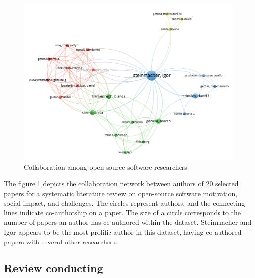 \begin{figure}[ht]
    \hspace*{-0.5in}
    \centering
    \includegraphics[width=1.1\linewidth]{figs/paperRelation.png}
    \caption{Collaboration among open-source software researchers}
    \label{fig:paperRelation}
\end{figure}

The figure \ref{fig:paperRelation} depicts the collaboration network between authors of 20 selected papers for a systematic literature review on open-source software motivation, social impact, and challenges. The circles represent authors, and the connecting lines indicate co-authorship on a paper. The size of a circle corresponds to the number of papers an author has co-authored within the dataset. Steinmacher and Igor  appears to be the most prolific author in this dataset, having co-authored papers with several other researchers.

\subsection{Review conducting}

